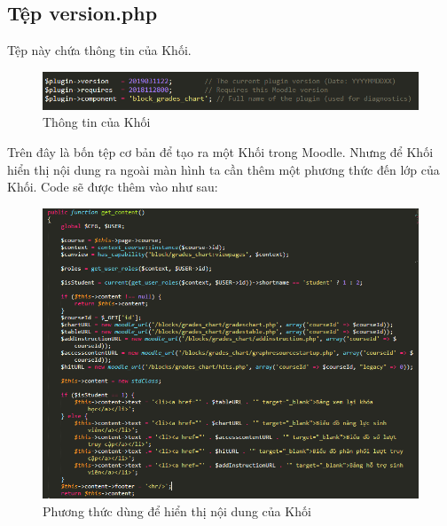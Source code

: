 \newpage
\subsection{Tệp version.php}

Tệp này chứa thông tin của Khối.

\begin{center}
	\begin{figure}[htp]
		\begin{center}
			\includegraphics[scale=0.8]{img/in4block}
		\end{center}
		\caption{Thông tin của Khối}
		\label{refhinh25}
	\end{figure}
\end{center}

Trên đây là bốn tệp cơ bản để tạo ra một Khối trong Moodle. Nhưng để Khối hiển thị nội dung ra ngoài màn hình ta cần thêm một phương thức đến lớp của Khối. Code sẽ được thêm vào như sau:

\begin{center}
	\begin{figure}[htp]
		\begin{center}
			\includegraphics[scale=0.8]{img/contentblock}
		\end{center}
		\caption{Phương thức dùng để hiển thị nội dung của Khối}
		\label{refhinh26}
	\end{figure}
\end{center}

